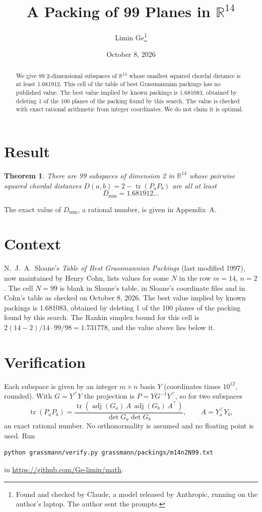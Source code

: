 \documentclass[11pt,a4paper]{article}
\title{A Packing of 99 Planes in $\mathbb{R}^{14}$}
\author{Limin Ge\thanks{Found and checked by Claude, a model released by Anthropic, running on the author's laptop. The author sent the prompts.}}
\date{October 8, 2026}
\newtheorem*{theorem}{Theorem}
\begin{document}
\maketitle
\begin{abstract}
We give 99 2-dimensional subspaces of $\mathbb{R}^{14}$ whose smallest squared chordal distance is at least 1.681912. This cell of the table of best Grassmannian packings has no published value. The best value implied by known packings is 1.681083, obtained by deleting 1 of the 100 planes of the packing found by this search. The value is checked with exact rational arithmetic from integer coordinates. We do not claim it is optimal.
\end{abstract}

\section{Result}
\begin{theorem}
There are 99 subspaces of dimension 2 in $\mathbb{R}^{14}$ whose pairwise squared chordal distances $D(a,b) = 2 - \operatorname{tr}(P_aP_b)$ are all at least
\[ D_{\min} = 1.681912\ldots \]
\end{theorem}
The exact value of $D_{\min}$, a rational number, is given in Appendix~A.


\section{Context}
N.~J.~A.~Sloane's \emph{Table of Best Grassmannian Packings} (last modified 1997), now maintained by Henry Cohn, lists values for some $N$ in the row $m=14$, $n=2$. The cell $N=99$ is blank in Sloane's table, in Sloane's coordinate files and in Cohn's table as checked on October 8, 2026. The best value implied by known packings is 1.681083, obtained by deleting 1 of the 100 planes of the packing found by this search. The Rankin simplex bound for this cell is $2(14-2)/14\cdot 99/98 = 1.731778$, and the value above lies below it.


\section{Verification}
Each subspace is given by an integer $m\times n$ basis $Y$ (coordinates times $10^{12}$, rounded). With $G=Y^\top Y$ the projection is $P=YG^{-1}Y^\top$, so for two subspaces
\[ \operatorname{tr}(P_aP_b)=\frac{\operatorname{tr}(\operatorname{adj}(G_a)\,A\,\operatorname{adj}(G_b)\,A^\top)}{\det G_a\det G_b},\qquad A=Y_a^\top Y_b, \]
an exact rational number. No orthonormality is assumed and no floating point is used. Run
\begin{verbatim}
python grassmann/verify.py grassmann/packings/m14n2N99.txt
\end{verbatim}
in \url{https://github.com/Ge-limin/math}.
\end{document}

